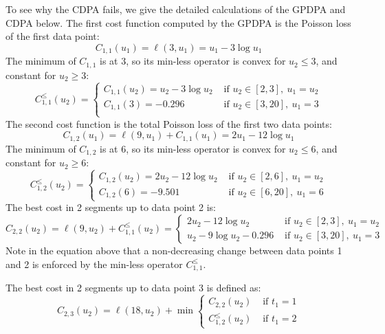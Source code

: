 \documentclass{article}
\begin{document}
To see why the CDPA fails, we give the detailed calculations of the
GPDPA and CDPA below. The first cost function computed by the GPDPA is
the Poisson loss of the first data point:
\begin{equation}
  C_{1,1}(u_1)=\ell(3, u_1) = u_1 -3\log u_1
\end{equation}
The minimum of $C_{1,1}$ is at 3, so its min-less operator is
convex for $u_2\leq 3$, and constant for $u_2\geq 3$:
\begin{equation}
    C^\leq_{1,1}(u_2) =
  \begin{cases}
    C_{1,1}(u_2) = u_2 -3\log u_2 & \text{ if } u_2 \in [2,3],\  u_1=u_2\\
    C_{1,1}(3) = -0.296 & \text{ if } u_2 \in [3,20],\  u_1=3\\
  \end{cases}
\end{equation}
The second cost function is the total Poisson loss of the first two
data points:
\begin{equation}
    C_{1,2}(u_1)=\ell(9, u_1)+C_{1,1}(u_1)=2u_1 -12\log u_1
\end{equation}
The minimum of $C_{1,2}$ is at 6, so its min-less operator is
convex for $u_2\leq 6$, and constant for $u_2\geq 6$:
\begin{equation}
    C^\leq_{1,2}(u_2)=
                     \begin{cases}
                       C_{1,2}(u_2)=2u_2 -12\log u_2 & \text{ if } u_2 \in[2, 6],\ u_1=u_2\\
                       C_{1,2}(6)=-9.501 &\text{ if } u_2\in [6,20],\ u_1=6
                     \end{cases}
\end{equation}
The best cost in 2 segments up to data point 2 is:
\begin{equation}
    C_{2,2}(u_2)=\ell(9, u_2) + C^\leq_{1,1}(u_2)   =
  \begin{cases}
    2u_2 -12\log u_2 & \text{ if } u_2 \in [2,3],\ u_1=u_2\\
    u_2 - 9\log u_2 -0.296 & \text{ if } u_2 \in [3, 20],\ u_1=3
  \end{cases}
\end{equation}
Note in the equation above that a non-decreasing change between data points 1 and 2 is enforced by the min-less operator $C_{1,1}^\leq$.

The best cost in 2 segments up to data point 3 is defined as:
\begin{equation}
    C_{2,3}(u_2)=\ell(18, u_2) + \min
                \begin{cases}
                  C_{2,2}(u_2) & \text{ if } t_1=1\\
                  C^\leq_{1,2}(u_2) & \text{ if } t_1=2
                \end{cases}
\end{equation}
\end{document}
